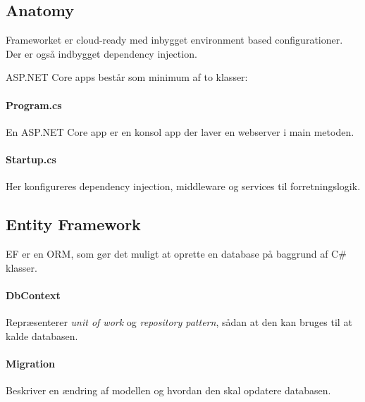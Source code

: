 \subsection{Anatomy}
Frameworket er cloud-ready med inbygget environment based configurationer. Der er også indbygget dependency injection.

ASP.NET Core apps består som minimum af to klasser:

\paragraph{Program.cs}
En ASP.NET Core app er en konsol app der laver en webserver i main metoden.

\paragraph{Startup.cs}
Her konfigureres dependency injection, middleware og services til forretningslogik.

\subsection{Entity Framework}
EF er en ORM, som gør det muligt at oprette en database på baggrund af C\# klasser.

\paragraph{DbContext}
Repræsenterer \textit{unit of work} og \textit{repository pattern}, sådan at den kan bruges til at kalde databasen.

\paragraph{Migration} Beskriver en ændring af modellen og hvordan den skal opdatere databasen.
